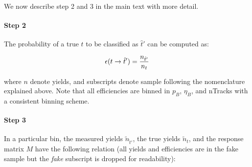 We now describe step 2 and 3 in the main text with more detail.

\paragraph{Step 2} The probability of a true $t$ to be classified as $\hat{t}'$ can
be computed as:

\begin{equation}
    \misEff[t]{\hat{t}'} = \frac{n_{\hat{t}'}}{n_{t}}
\end{equation}

where $n$ denote yields, and subscripts denote sample following the nomenclature
explained above. Note that all efficiencies are binned in $p_B$, $\eta_B$, and
nTracks with a consistent binning scheme.


\paragraph{Step 3} In a particular bin, the measured
yields $\tilde{n}_{\hat{t}'}$, the true yields $\tilde{n}_{t}$, and the response matrix $M$
have the following relation (all yields and efficiencies are in the fake \muon sample but
the \emph{fake} subscript is dropped for readability):

